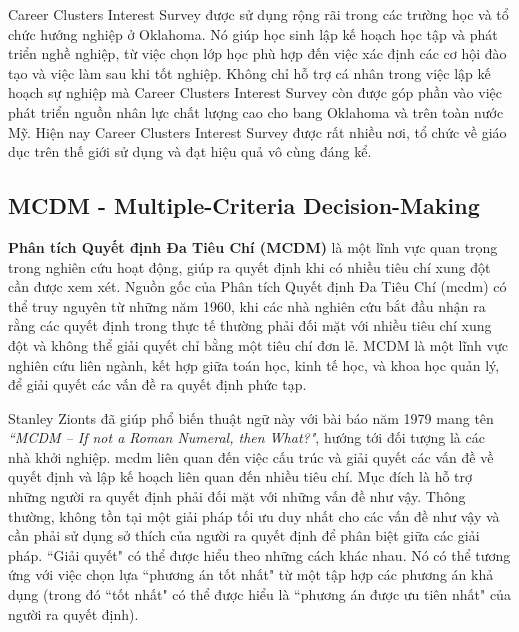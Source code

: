 Career Clusters Interest Survey được sử dụng rộng rãi trong các trường học và tổ chức hướng nghiệp ở Oklahoma. Nó giúp học sinh lập kế hoạch học tập và phát triển nghề nghiệp, từ việc chọn lớp học phù hợp đến việc xác định các cơ hội đào tạo và việc làm sau khi tốt nghiệp. Không chỉ hỗ trợ cá nhân trong việc lập kế hoạch sự nghiệp mà Career Clusters Interest Survey còn được  góp phần vào việc phát triển nguồn nhân lực chất lượng cao cho bang Oklahoma và trên toàn nước Mỹ. Hiện nay Career Clusters Interest Survey được rất nhiều nơi, tổ chức về giáo dục trên thế giới sử dụng và đạt hiệu quả vô cùng đáng kể. 

\subsection{MCDM - Multiple-Criteria Decision-Making}
\textbf{Phân tích Quyết định Đa Tiêu Chí (MCDM)} là một lĩnh vực quan trọng trong nghiên cứu hoạt động, giúp ra quyết định khi có nhiều tiêu chí xung đột cần được xem xét. Nguồn gốc của Phân tích Quyết định Đa Tiêu Chí (\acrshort{mcdm}) có thể truy nguyên từ những năm 1960, khi các nhà nghiên cứu bắt đầu nhận ra rằng các quyết định trong thực tế thường phải đối mặt với nhiều tiêu chí xung đột và không thể giải quyết chỉ bằng một tiêu chí đơn lẻ. MCDM là một lĩnh vực nghiên cứu liên ngành, kết hợp giữa toán học, kinh tế học, và khoa học quản lý, để giải quyết các vấn đề ra quyết định phức tạp.

Stanley Zionts đã giúp phổ biến thuật ngữ này với bài báo năm 1979 mang tên \textit{``MCDM – If not a Roman Numeral, then What?"}, hướng tới đối tượng là các nhà khởi nghiệp. \acrshort{mcdm} liên quan đến việc cấu trúc và giải quyết các vấn đề về quyết định và lập kế hoạch liên quan đến nhiều tiêu chí. Mục đích là hỗ trợ những người ra quyết định phải đối mặt với những vấn đề như vậy. Thông thường, không tồn tại một giải pháp tối ưu duy nhất cho các vấn đề như vậy và cần phải sử dụng sở thích của người ra quyết định để phân biệt giữa các giải pháp. ``Giải quyết" có thể được hiểu theo những cách khác nhau. Nó có thể tương ứng với việc chọn lựa ``phương án tốt nhất" từ một tập hợp các phương án khả dụng (trong đó ``tốt nhất" có thể được hiểu là ``phương án được ưu tiên nhất" của người ra quyết định).

